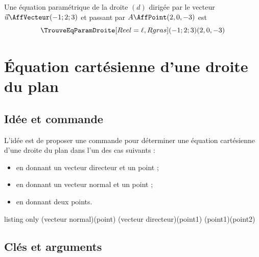 \documentclass[a4paper,french,11pt]{article}
\newcommand\cmaj[1]{%
	{\tcbox[vignetteMaJ]{#1}\xspace}%
}
\begin{document}
\begin{PresCodePL}{}
Une équation paramétrique de la droite $(d)$ dirigée par le vecteur $\vec{u}\AffVecteur(-1;2;3)$ et passant par $A\AffPoint(2,0,-3)$ est
\[ \TrouveEqParamDroite[Reel=\ell,Rgras](-1;2;3)(2,0,-3) \]
\end{PresCodePL}

\newpage

\section{Équation cartésienne d'une droite du plan}\label{eqcartdroite}

\subsection{Idée et commande}

\begin{tipblock}
\cmaj{2.6.4} L'idée est de proposer une commande pour déterminer une équation cartésienne d'une droite du plan dans l'un des cas suivants :

\begin{itemize}
	\item en donnant un vecteur directeur et un point ;
	\item en donnant un vecteur normal et un point ;
	\item en donnant deux points.
\end{itemize}
\vspace*{-\baselineskip}\leavevmode
\end{tipblock}

\begin{PresCodeTexPL}{listing only}
\TrouveEqCartDroite[clés](vecteur normal)(point)
(vecteur directeur)(point1)
\TrouveEqCartDroite[clés](point1)(point2)
\end{PresCodeTexPL}

\subsection{Clés et arguments}
\end{document}
